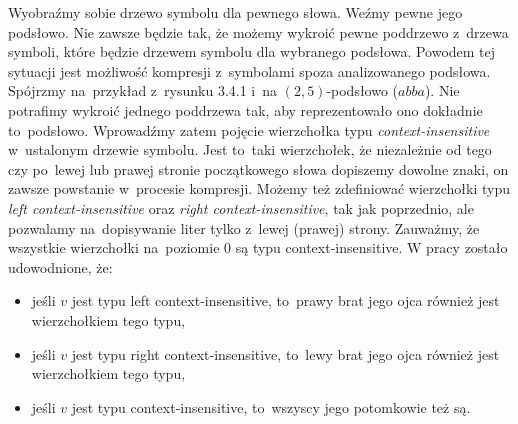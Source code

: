 \documentclass[declaration,shortabstract]{iithesis}
\theoremstyle{definition} \newtheorem{definition}{Definicja}[chapter]
\theoremstyle{plain} \newtheorem{remark}[definition]{Obserwacja}
\theoremstyle{plain} \newtheorem{theorem}[definition]{Twierdzenie}
\theoremstyle{plain} \newtheorem{example}{Przykład}[definition]
\theoremstyle{plain} \newtheorem{lemma}[definition]{Lemat}
\begin{document}
Wyobraźmy sobie drzewo symbolu dla pewnego słowa. Weźmy pewne jego podsłowo. Nie zawsze będzie tak, że możemy wykroić pewne poddrzewo z~drzewa symboli, które będzie drzewem symbolu dla wybranego podsłowa. Powodem tej sytuacji jest możliwość kompresji z~symbolami spoza analizowanego podsłowa. Spójrzmy na~przykład z~rysunku 3.4.1 i~na $(2, 5)$-podsłowo ($abba$). Nie potrafimy wykroić jednego poddrzewa tak, aby reprezentowało ono dokładnie to~podsłowo. Wprowadźmy zatem pojęcie wierzchołka typu \textit{context-insensitive} w~ustalonym drzewie symbolu. Jest to~taki wierzchołek, że niezależnie od tego czy po~lewej lub prawej stronie początkowego słowa dopiszemy dowolne znaki, on zawsze powstanie w~procesie kompresji. Możemy też zdefiniować wierzchołki typu \textit{left context-insensitive} oraz \textit{right context-insensitive}, tak jak poprzednio, ale pozwalamy na~dopisywanie liter tylko z~lewej (prawej) strony. Zauważmy, że wszystkie wierzchołki na~poziomie $0$ są typu context-insensitive. W pracy \cite{gawrychowski} zostało udowodnione, że:
\begin{itemize}
    \item jeśli $v$ jest typu left context-insensitive, to~prawy brat jego ojca również jest wierzchołkiem tego typu,
    \item jeśli $v$ jest typu right context-insensitive, to~lewy brat jego ojca również jest wierzchołkiem tego typu,
    \item jeśli $v$ jest typu context-insensitive, to~wszyscy jego potomkowie też są.
\end{itemize}
\end{document}
